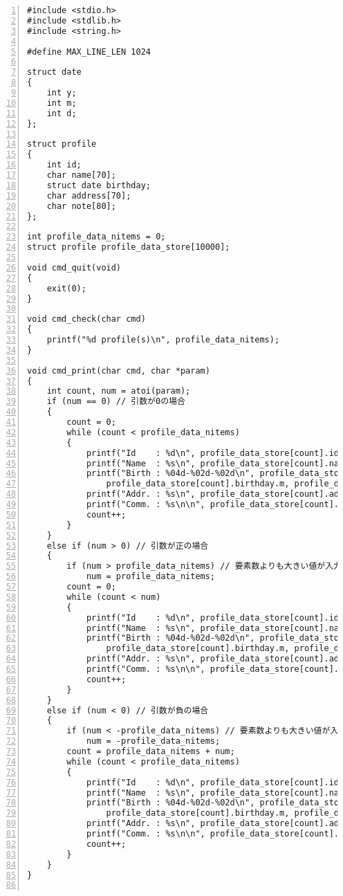 \documentclass[autodetect-engine,dvi=dvipdfmx,ja=standard,
               a4j,11pt]{bxjsarticle}
\begin{document}
\begin{Verbatim}[numbers=left, xleftmargin=10mm, numbersep=6pt,
    fontsize=\small, baselinestretch=0.8]
#include <stdio.h>
#include <stdlib.h>
#include <string.h>

#define MAX_LINE_LEN 1024

struct date
{
    int y;
    int m;
    int d;
};

struct profile
{
    int id;
    char name[70];
    struct date birthday;
    char address[70];
    char note[80];
};

int profile_data_nitems = 0;
struct profile profile_data_store[10000];

void cmd_quit(void)
{
    exit(0);
}

void cmd_check(char cmd)
{
    printf("%d profile(s)\n", profile_data_nitems);
}

void cmd_print(char cmd, char *param)
{
    int count, num = atoi(param);
    if (num == 0) // 引数が0の場合
    {
        count = 0;
        while (count < profile_data_nitems)
        {
            printf("Id    : %d\n", profile_data_store[count].id);
            printf("Name  : %s\n", profile_data_store[count].name);
            printf("Birth : %04d-%02d-%02d\n", profile_data_store[count].birthday.y,
                profile_data_store[count].birthday.m, profile_data_store[count].birthday.d);
            printf("Addr. : %s\n", profile_data_store[count].address);
            printf("Comm. : %s\n\n", profile_data_store[count].note);
            count++;
        }
    }
    else if (num > 0) // 引数が正の場合
    {
        if (num > profile_data_nitems) // 要素数よりも大きい値が入力された場合
            num = profile_data_nitems;
        count = 0;
        while (count < num)
        {
            printf("Id    : %d\n", profile_data_store[count].id);
            printf("Name  : %s\n", profile_data_store[count].name);
            printf("Birth : %04d-%02d-%02d\n", profile_data_store[count].birthday.y,
                profile_data_store[count].birthday.m, profile_data_store[count].birthday.d);
            printf("Addr. : %s\n", profile_data_store[count].address);
            printf("Comm. : %s\n\n", profile_data_store[count].note);
            count++;
        }
    }
    else if (num < 0) // 引数が負の場合
    {
        if (num < -profile_data_nitems) // 要素数よりも大きい値が入力された場合
            num = -profile_data_nitems;
        count = profile_data_nitems + num;
        while (count < profile_data_nitems)
        {
            printf("Id    : %d\n", profile_data_store[count].id);
            printf("Name  : %s\n", profile_data_store[count].name);
            printf("Birth : %04d-%02d-%02d\n", profile_data_store[count].birthday.y,
                profile_data_store[count].birthday.m, profile_data_store[count].birthday.d);
            printf("Addr. : %s\n", profile_data_store[count].address);
            printf("Comm. : %s\n\n", profile_data_store[count].note);
            count++;
        }
    }
}


\end{Verbatim}
\end{document}
